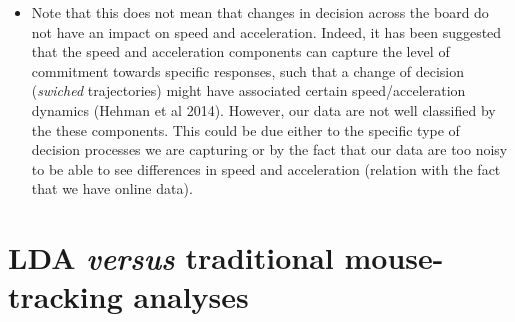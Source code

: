 \documentclass{article}
\newcommand{\addMM}[1]{{\leavevmode\color{red}#1}}
\begin{document}
\begin{itemize}
\item Note that this does not mean that changes in decision across the board do not have an impact on speed and acceleration. Indeed, it has been suggested that the speed and acceleration components can capture the level of commitment towards specific responses, such that a change of decision (\textit{swiched} trajectories) might have associated certain speed/acceleration dynamics (Hehman et al 2014). 
\addMM{However, our data are not well classified by the these components. This could be due either to the specific type of decision processes we are capturing or by the fact that our data are too noisy to be able to see differences in speed and acceleration (relation with the fact that we have online data).}




\end{itemize}

\section{LDA \emph{versus} traditional mouse-tracking analyses}
\end{document}
